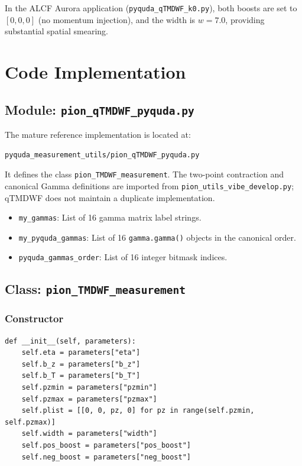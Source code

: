 \documentclass[11pt]{article}
\begin{document}
In the ALCF Aurora application (\texttt{pyquda\_qTMDWF\_k0.py}), both boosts are set to $[0, 0, 0]$ (no momentum injection), and the width is $w = 7.0$, providing substantial spatial smearing.

\section{Code Implementation}
\label{sec:implementation}

\subsection{Module: \texttt{pion\_qTMDWF\_pyquda.py}}

The mature reference implementation is located at:

\begin{verbatim}
pyquda_measurement_utils/pion_qTMDWF_pyquda.py
\end{verbatim}

It defines the class \texttt{pion\_TMDWF\_measurement}.  The two-point
contraction and canonical Gamma definitions are imported from
\texttt{pion\_utils\_vibe\_develop.py}; qTMDWF does not maintain a duplicate
implementation.

\begin{itemize}
    \item \texttt{my\_gammas}: List of 16 gamma matrix label strings.
    \item \texttt{my\_pyquda\_gammas}: List of 16 \texttt{gamma.gamma()} objects in the canonical order.
    \item \texttt{pyquda\_gammas\_order}: List of 16 integer bitmask indices.
\end{itemize}

\subsection{Class: \texttt{pion\_TMDWF\_measurement}}

\subsubsection{Constructor}

\begin{lstlisting}
def __init__(self, parameters):
    self.eta = parameters["eta"]
    self.b_z = parameters["b_z"]
    self.b_T = parameters["b_T"]
    self.pzmin = parameters["pzmin"]
    self.pzmax = parameters["pzmax"]
    self.plist = [[0, 0, pz, 0] for pz in range(self.pzmin, self.pzmax)]
    self.width = parameters["width"]
    self.pos_boost = parameters["pos_boost"]
    self.neg_boost = parameters["neg_boost"]
\end{lstlisting}
\end{document}
